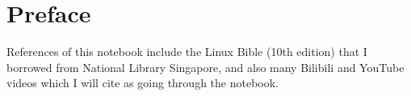 \chapter*{Preface}

References of this notebook include the Linux Bible (10th edition) that I borrowed from National Library Singapore, and also many Bilibili and YouTube videos which I will cite as going through the notebook. 